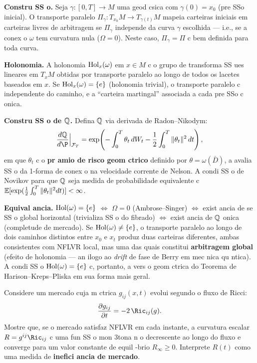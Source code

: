\begin{sol}
\textbf{Constru SS o.} Seja $\gamma:[0,T]\to M$ uma geod csica com $\gamma(0)=x_0$ (pre SSo inicial). O transporte paralelo $\Pi_\gamma:T_{x_0}M\to T_{\gamma(t)}M$ mapeia carteiras iniciais em carteiras livres de arbitragem se $\Pi_\gamma$ independe da curva $\gamma$ escolhida --- i.e., se a conex o $\omega$ tem curvatura nula ($\Omega=0$). Neste caso, $\Pi_\gamma = \Pi$ c bem definida para toda curva.

\textbf{Holonomia.} A holonomia $\operatorname{Hol}_x(\omega)$ em $x\in M$ c o grupo de transforma SS ues lineares em $T_xM$ obtidas por transporte paralelo ao longo de todos os lacetes baseados em $x$. Se $\operatorname{Hol}_x(\omega) = \{e\}$ (holonomia trivial), o transporte paralelo c independente do caminho, e a ``carteira martingal'' associada a cada pre SSo c onica.

\textbf{Constru SS o de $\mathbb{Q}$.} Defina $\mathbb{Q}$ via derivada de Radon--Nikodym:
\begin{equation}
 \frac{d\Q}{d\P}\Big|_{\mathcal{F}_T} = \exp\!\left(-\int_0^T \theta_t\,dW_t - \frac{1}{2}\int_0^T \|\theta_t\|^2\,dt\right),
\end{equation}
em que $\theta_t$ c o \textbf{pr amio de risco geom ctrico} definido por $\theta = \omega(\bar{D})$, a avalia SS o da 1-forma de conex o na velocidade corrente de Nelson. A condi SS o de Novikov para que $\mathbb{Q}$ seja medida de probabilidade equivalente c $\mathbb{E}[\exp(\frac{1}{2}\int_0^T\|\theta_t\|^2 dt)]<\infty$.

\textbf{Equival ancia.} $\operatorname{Hol}(\omega)=\{e\}$ $\iff$ $\Omega=0$ (Ambrose--Singer) $\iff$ exist ancia de se SS o global horizontal (trivializa SS o do fibrado) $\iff$ exist ancia de $\mathbb{Q}$ onica (completude de mercado). Se $\operatorname{Hol}(\omega)\neq\{e\}$, o transporte paralelo ao longo de dois caminhos distintos entre $x_0$ e $x_t$ produz duas carteiras diferentes, ambas consistentes com NFLVR local, mas uma das quais constitui \textbf{arbitragem global} (efeito de holonomia --- an ilogo ao \textit{drift} de fase de Berry em mec nica qu ntica). A condi SS o $\operatorname{Hol}(\omega)=\{e\}$ c, portanto, a vers o geom ctrica do Teorema de Harison--Kreps--Pliska em sua forma mais geral.
\end{sol}

\begin{exer}
\label{ex:ricci_flow}
Considere um mercado cuja m ctrica $g_{ij}(x,t)$ evolui segundo o fluxo de Ricci:
\begin{equation}
 \frac{\partial g_{ij}}{\partial t} = -2\,\Ric_{ij}(g).
\end{equation}
Mostre que, se o mercado satisfaz NFLVR em cada instante, a curvatura escalar $R = g^{ij}\Ric_{ij}$ c uma fun SS o mon 3tona n o decrescente ao longo do fluxo e converge para um valor constante de equil -brio $R_\infty\geq 0$. Interprete $R(t)$ como uma medida de \textbf{inefici ancia de mercado}.
\end{exer}

